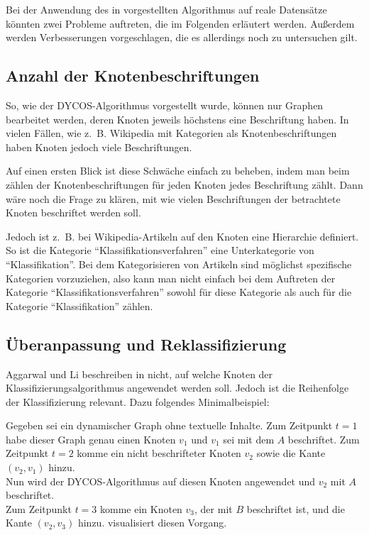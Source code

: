 Bei der Anwendung des in \cite{aggarwal2011} vorgestellten Algorithmus auf
reale Datensätze könnten zwei Probleme auftreten, die im Folgenden erläutert
werden. Außerdem werden Verbesserungen vorgeschlagen, die es allerdings noch zu
untersuchen gilt.

\subsection{Anzahl der Knotenbeschriftungen}
So, wie der DYCOS-Algorithmus vorgestellt wurde, können nur Graphen bearbeitet
werden, deren Knoten jeweils höchstens eine Beschriftung haben. In vielen
Fällen, wie z.~B. Wikipedia mit Kategorien als Knotenbeschriftungen haben
Knoten jedoch viele Beschriftungen.

Auf einen ersten Blick ist diese Schwäche einfach zu beheben, indem man beim
zählen der Knotenbeschriftungen für jeden Knoten jedes Beschriftung zählt. Dann
wäre noch die Frage zu klären, mit wie vielen Beschriftungen der betrachtete
Knoten beschriftet werden soll.

Jedoch ist z.~B. bei Wikipedia-Artikeln auf den Knoten eine Hierarchie
definiert. So ist die Kategorie \enquote{Klassifikationsverfahren} eine
Unterkategorie von \enquote{Klassifikation}. Bei dem Kategorisieren von
Artikeln sind möglichst spezifische Kategorien vorzuziehen, also kann man nicht
einfach bei dem Auftreten der Kategorie \enquote{Klassifikationsverfahren}
sowohl für diese Kategorie als auch für die Kategorie \enquote{Klassifikation}
zählen.


\subsection{Überanpassung und Reklassifizierung}
Aggarwal und Li beschreiben in \cite{aggarwal2011} nicht, auf welche Knoten der
Klassifizierungsalgorithmus angewendet werden soll. Jedoch ist die Reihenfolge
der Klassifizierung relevant. Dazu folgendes Minimalbeispiel:

Gegeben sei ein dynamischer Graph ohne textuelle Inhalte. Zum Zeitpunkt $t=1$
habe dieser Graph genau einen Knoten $v_1$ und $v_1$  sei mit dem $A$
beschriftet. Zum Zeitpunkt $t=2$ komme ein nicht beschrifteter Knoten $v_2$
sowie die Kante $(v_2, v_1)$ hinzu.\\
Nun wird der DYCOS-Algorithmus auf diesen Knoten angewendet und $v_2$ mit $A$
beschriftet.\\
Zum Zeitpunkt $t=3$ komme ein Knoten $v_3$, der mit $B$ beschriftet ist, und
die Kante $(v_2, v_3)$ hinzu.  visualisiert diesen Vorgang.

